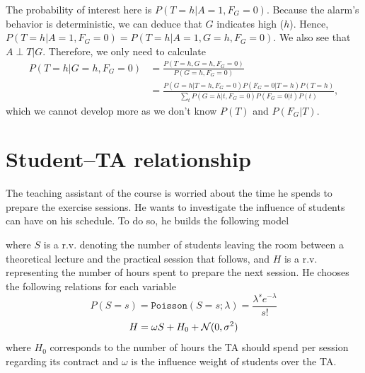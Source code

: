 \documentclass[11pt, a4paper]{article}
\begin{document}
\begin{enumerate}
    \begin{solution}
        The probability of interest here is $P(T = h | A = 1, F_G = 0)$. Because the alarm's behavior is deterministic, we can deduce that $G$ indicates high ($h$). Hence, $P(T = h | A = 1, F_G = 0) = P(T = h | A = 1, G = h, F_G = 0)$. We also see that $A \perp T | G$. Therefore, we only need to calculate
        \begin{align*}
            P(T = h | G = h, F_G = 0) & = \frac{P(T = h, G = h, F_G = 0)}{P(G = h, F_G = 0)} \\
            & = \frac{P(G = h | T = h, F_G = 0) P(F_G = 0 | T = h) P(T = h)}{\sum_t P(G = h | t, F_G = 0) P(F_G = 0 | t) P(t)} ,
        \end{align*}
        which we cannot develop more as we don't know $P(T)$ and $P(F_G | T)$.
    \end{solution}
\end{enumerate}

\newpage

\section{Student--TA relationship}

The teaching assistant of the course is worried about the time he spends to prepare the exercise sessions. He wants to investigate the influence of students can have on his schedule. To do so, he builds the following model

\begin{figure}[h]
    \centering
\end{figure}

where $S$ is a r.v. denoting the number of students leaving the room between a theoretical lecture and the practical session that follows, and $H$ is a r.v. representing the number of hours spent to prepare the next session. He chooses the following relations for each variable
\begin{equation}
    \label{P_S}
    P(S = s) = \texttt{Poisson}(S=s;\lambda) = \dfrac{\lambda ^s e^{-\lambda}}{s!}
\end{equation}
\begin{equation}
    \label{P_H_g_S}
    H = \omega S + H_0 + \mathcal{N}(0, \text{$\sigma^2$})
\end{equation}
where $H_0$ corresponds to the number of hours the TA should spend per session regarding its contract and $\omega$ is the influence weight of students over the TA.
\end{document}

